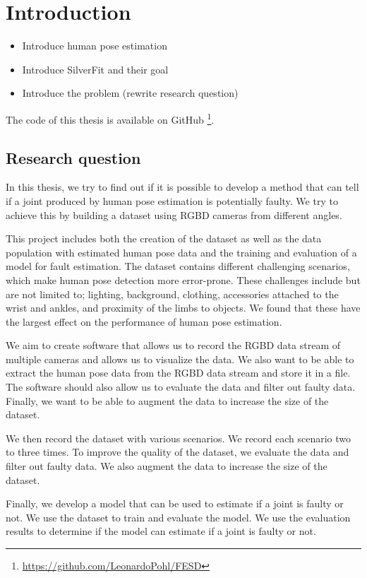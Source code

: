 \chapter{Introduction}
\setcounter{page}{1}

\begin{itemize}
  \item Introduce human pose estimation
  \item Introduce SilverFit and their goal
  \item Introduce the problem (rewrite research question)
\end{itemize}

The code of this thesis is available on GitHub \footnote{\url{https://github.com/LeonardoPohl/FESD}}.

\section{Research question}

In this thesis, we try to find out if it is possible to develop a method that can tell if a joint produced by human pose estimation is potentially faulty. We try to achieve this by building a dataset using RGBD cameras from different angles.

This project includes both the creation of the dataset as well as the data population with estimated human pose data and the training and evaluation of a model for fault estimation. The dataset contains different challenging scenarios, which make human pose detection more error-prone. These challenges include but are not limited to; lighting, background, clothing, accessories attached to the wrist and ankles, and proximity of the limbs to objects. We found that these have the largest effect on the performance of human pose estimation. 

We aim to create software that allows us to record the RGBD data stream of multiple cameras and allows us to visualize the data. We also want to be able to extract the human pose data from the RGBD data stream and store it in a file. The software should also allow us to evaluate the data and filter out faulty data. Finally, we want to be able to augment the data to increase the size of the dataset.

We then record the dataset with various scenarios. We record each scenario two to three times. To improve the quality of the dataset, we evaluate the data and filter out faulty data. We also augment the data to increase the size of the dataset.

Finally, we develop a model that can be used to estimate if a joint is faulty or not. We use the dataset to train and evaluate the model. We use the evaluation results to determine if the model can estimate if a joint is faulty or not.